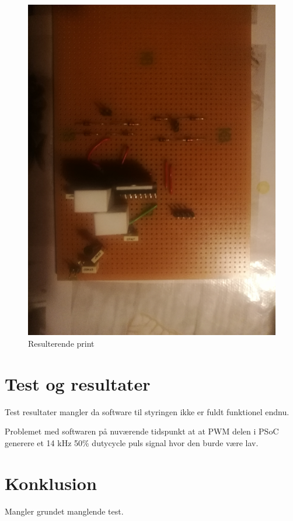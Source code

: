 \begin{figure}[H]
	\centering
	\includegraphics[scale=0.1,trim=0 0 0 0, clip]{Billeder/solderedprint.jpg}
	\caption{Resulterende print}
	\label{solderedprint}
\end{figure}

\section{Test og resultater}
Test resultater mangler da software til styringen ikke er fuldt funktionel endnu.

Problemet med softwaren på nuværende tidspunkt at at PWM delen i PSoC generere et 14 kHz 50\% dutycycle puls signal hvor den burde være lav.

\section{Konklusion}
Mangler grundet manglende test.
